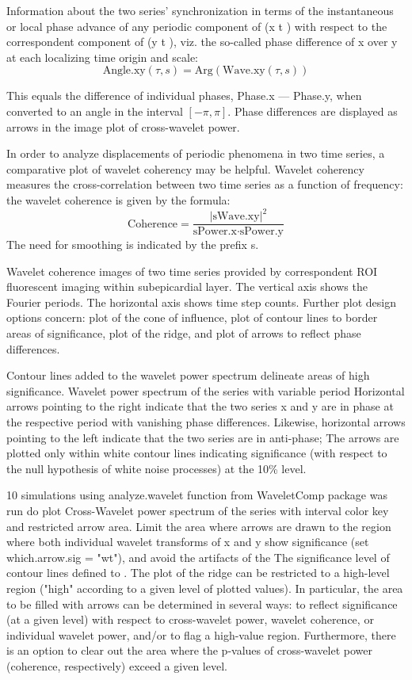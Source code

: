 \documentclass{biophys-new}
\begin{document}
Information about the two series’ synchronization in terms of the instantaneous or local phase advance of any periodic component of (x t ) with respect to the correspondent component of (y t ), viz. the so-called phase difference of x over y at each localizing time origin and scale:
\begin{equation}\label{eq:angle}
\text{Angle.xy}(\tau, s)=\text{Arg}(\text{Wave.xy}(\tau, s))
\end{equation}

This equals the difference of individual phases, Phase.x --- Phase.y, when converted to an angle in the
interval $[-\pi,\pi]$.
Phase differences are displayed as arrows in the image plot of cross-wavelet power.

In order to analyze displacements of periodic phenomena in two time series, a comparative plot of wavelet coherency may be helpful.
Wavelet coherency  measures the cross-correlation between two time series as a function of frequency: the wavelet coherence is given by the formula:
\begin{equation}\label{eq:coherence}
\text{Coherence}=\frac{|\text{sWave.xy}|^2}{\text{sPower.x}\cdot\text{sPower.y}}
\end{equation}
The need for smoothing is indicated by the prefix s.

Wavelet coherence images of two time series provided by correspondent ROI fluorescent imaging within subepicardial layer.
The vertical axis shows the Fourier periods. The horizontal axis shows time step counts.
Further plot design options concern: plot of the cone of influence, plot of contour lines to border areas of significance, plot of the ridge, and plot of arrows to reflect phase differences.

Contour lines added to the wavelet power spectrum delineate areas of high significance.
Wavelet power spectrum of the series with variable period
Horizontal arrows pointing to the right indicate that the two series x and y are in phase at the respective period with vanishing phase differences.
Likewise, horizontal arrows pointing to the left indicate that the two series are in anti-phase;
The arrows are plotted only within white contour lines indicating significance (with respect to the null hypothesis of white noise processes) at the 10\% level.

10 simulations using analyze.wavelet function from WaveletComp package was run do plot Cross-Wavelet power spectrum of the series with interval color key and restricted arrow area.
Limit the area where arrows are drawn to the region where both individual wavelet transforms of x and y show significance (set which.arrow.sig = "wt"), and avoid the artifacts of the
The significance level of contour lines defined to . The plot of the ridge can be restricted to a high-level region ("high" according to a given level of plotted values). In particular, the area to be filled with arrows can be determined in several ways: to reflect significance (at a given level) with respect to cross-wavelet power, wavelet coherence, or individual wavelet power, and/or to flag a high-value region. Furthermore, there is an option to clear out the area where the p-values of cross-wavelet power (coherence, respectively) exceed a given level.
\end{document}
